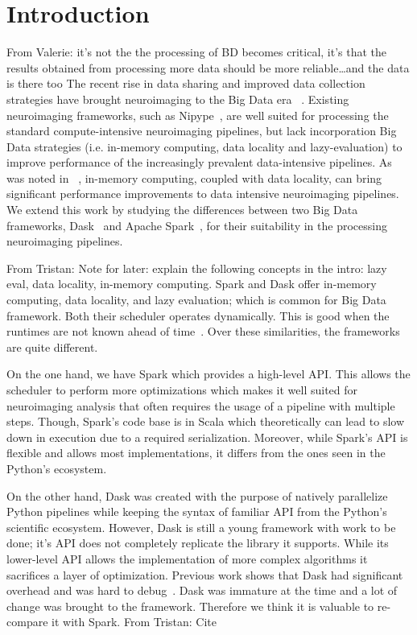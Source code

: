 \documentclass[conference]{IEEEtran}
\newcommand{\TG}[1]{\color{cyan}From Tristan: #1 \color{black}}
\newcommand{\VHS}[1]{\color{green}From Valerie: #1 \color{black}}
\begin{document}
\section{Introduction}
\VHS{it's not the the processing of BD becomes critical, it's that the results obtained
from processing more data should be more reliable\dots and the data is there too}
The recent rise in data sharing and improved data collection strategies
have brought neuroimaging to the Big Data era ~\cite{ALFAROALMAGRO:18,
UKBioBank:18}. Existing neuroimaging frameworks, such as Nipype~\cite{Nipype:11},
are well suited for processing the standard compute-intensive neuroimaging pipelines,
but lack incorporation Big Data strategies (i.e. in-memory computing,
data locality and lazy-evaluation) to improve performance of the increasingly
prevalent data-intensive pipelines. As was noted in ~\cite{Hayot-Sasson:17}, 
in-memory computing, coupled with data locality, can bring significant performance
improvements to data intensive neuroimaging pipelines. We extend this work by studying
the differences between two Big Data frameworks, Dask~\cite{Dask:15} and Apache Spark~\cite{Spark:16},
for their suitability in the processing neuroimaging pipelines. 

\TG{Note for later: explain the following concepts in the intro: lazy eval, data locality, in-memory computing.}
Spark and Dask offer in-memory computing, data locality, and lazy evaluation; which
is common for Big Data framework. Both their scheduler operates dynamically. This is
good when the runtimes are not known ahead of time~\cite{Dask:15}. Over these
similarities, the frameworks are quite different.

On the one hand, we have Spark which provides a high-level API. This allows the
scheduler to perform more optimizations which makes it well suited for neuroimaging
analysis that often requires the usage of a pipeline with multiple steps. Though,
Spark's code base is in Scala which theoretically can lead to slow down in execution
due to a required serialization. Moreover, while Spark's API is flexible and allows
most implementations, it differs from the ones seen in the Python's ecosystem.

On the other hand, Dask was created with the purpose of natively parallelize Python
pipelines while keeping the syntax of familiar API from the Python's scientific
ecosystem. However, Dask is still a young framework with work to be done; it's API
does not completely replicate the library it supports. While its lower-level API
allows the implementation of more complex algorithms it sacrifices a layer of
optimization.
Previous work shows that Dask had significant overhead and was
hard to debug~\cite{Mehta:17}.
Dask was immature at the time and a lot of change was brought to the framework.
Therefore we think it is valuable to re-compare it with Spark.
\TG{Cite~\cite{hayot2019performance}}
\end{document}
